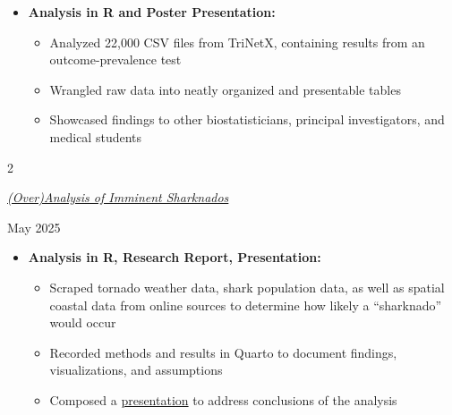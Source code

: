 \documentclass[
  16,
]{article}
\providecommand{\tightlist}{%
  \setlength{\itemsep}{0pt}\setlength{\parskip}{0pt}}
\begin{document}
\begin{itemize}
\tightlist
\item
  \textbf{Analysis in R and Poster Presentation:}

  \begin{itemize}
  \tightlist
  \item
    Analyzed 22,000 CSV files from TriNetX, containing results from an
    outcome-prevalence test
  \item
    Wrangled raw data into neatly organized and presentable tables
  \item
    Showcased findings to other biostatisticians, principal
    investigators, and medical students
  \end{itemize}
\end{itemize}

\vspace{3pt}

\begin{large}
  \begin{multicols}{2}
    \begin{flushleft}
  \textit{\href{https://jesusrod44.github.io/portfolio/files/sharknados.pdf}{(Over)Analysis of Imminent Sharknados}}
  \end{flushleft}
    \begin{flushright}
      May 2025
    \end{flushright}
  \end{multicols}
  \vspace{-0.17cm}
\end{large}
\vspace{-0.16cm}

\begin{itemize}
\tightlist
\item
  \textbf{Analysis in R, Research Report, Presentation:}

  \begin{itemize}
  \tightlist
  \item
    Scraped tornado weather data, shark population data, as well as
    spatial coastal data from online sources to determine how likely a
    ``sharknado'' would occur
  \item
    Recorded methods and results in Quarto to document findings,
    visualizations, and assumptions
  \item
    Composed a
    \href{https://jesusrod44.github.io/portfolio/files/sharknado_presentation.pdf}{presentation}
    to address conclusions of the analysis
  \end{itemize}
\end{itemize}
\end{document}
